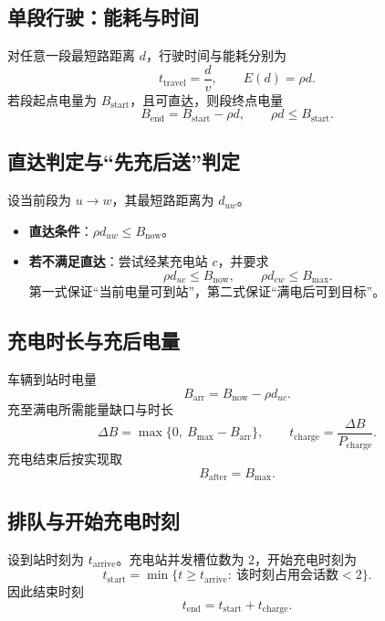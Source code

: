 \documentclass[UTF8,a4paper]{ctexart}
\begin{document}
\subsection{单段行驶：能耗与时间}
对任意一段最短路距离 $d$，行驶时间与能耗分别为
\begin{equation}
  t_{\mathrm{travel}}=\frac{d}{v},\qquad
  E(d)=\rho d.
\end{equation}
若段起点电量为 $B_{\mathrm{start}}$，且可直达，则段终点电量
\begin{equation}
  B_{\mathrm{end}}=B_{\mathrm{start}}-\rho d,\qquad
  \rho d\le B_{\mathrm{start}}.
\end{equation}

\subsection{直达判定与“先充后送”判定}
设当前段为 $u\rightarrow w$，其最短路距离为 $d_{uw}$。
\begin{itemize}
  \item \textbf{直达条件}：$\rho d_{uw}\le B_{\mathrm{now}}$。
  \item \textbf{若不满足直达}：尝试经某充电站 $c$，并要求
  \begin{equation}
    \rho d_{uc}\le B_{\mathrm{now}},\qquad
    \rho d_{cw}\le B_{\max}.
  \end{equation}
  第一式保证“当前电量可到站”，第二式保证“满电后可到目标”。
\end{itemize}

\subsection{充电时长与充后电量}
车辆到站时电量
\begin{equation}
  B_{\mathrm{arr}}=B_{\mathrm{now}}-\rho d_{uc}.
\end{equation}
充至满电所需能量缺口与时长
\begin{equation}
  \Delta B=\max\{0,\ B_{\max}-B_{\mathrm{arr}}\},\qquad
  t_{\mathrm{charge}}=\frac{\Delta B}{P_{\mathrm{charge}}}.
\end{equation}
充电结束后按实现取
\begin{equation}
  B_{\mathrm{after}}=B_{\max}.
\end{equation}

\subsection{排队与开始充电时刻}
设到站时刻为 $t_{\mathrm{arrive}}$。充电站并发槽位数为 $2$，开始充电时刻为
\begin{equation}
  t_{\mathrm{start}}
  =\min\{t\ge t_{\mathrm{arrive}}:\ \text{该时刻占用会话数}<2\}.
\end{equation}
因此结束时刻
\begin{equation}
  t_{\mathrm{end}}=t_{\mathrm{start}}+t_{\mathrm{charge}}.
\end{equation}
\end{document}
